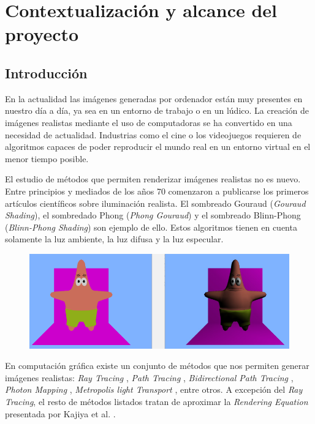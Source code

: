 \documentclass[twoside,a4paper,titlepage,11pt]{report}
\begin{document}
\iftrue

\newpage
\tableofcontents*
\fi

\newpage

\chapter{Contextualización y alcance del proyecto}

\section{Introducción}

En la actualidad las imágenes generadas por ordenador están muy presentes en nuestro día a día, ya sea en un entorno de trabajo o en un lúdico. La creación de imágenes realistas mediante el uso de computadoras se ha convertido en una necesidad de actualidad. Industrias como el cine o los videojuegos requieren de algoritmos capaces de poder reproducir el mundo real en un entorno virtual en el menor tiempo posible.

El estudio de métodos que permiten renderizar imágenes realistas no es nuevo. Entre principios y mediados de los años 70 comenzaron a publicarse los primeros artículos científicos sobre iluminación realista. El sombreado Gouraud (\textit{Gouraud Shading}), el sombredado Phong (\textit{Phong Gouraud}) y el sombreado Blinn-Phong (\textit{Blinn-Phong Shading}) son ejemplo de ello. Estos algoritmos tienen en cuenta solamente la luz ambiente, la luz difusa y la luz especular. 

\begin{figure}[ht]
	\centering
	\includegraphics[scale=0.5]{media/shading_idi.png}
	\caption{}
    \label{fig:idi}
\end{figure}

En computación gráfica existe un conjunto de métodos que nos permiten generar imágenes realistas: \textit{Ray Tracing} \cite{Whitted1980}, \textit{Path Tracing} \cite{Kajiya1986}, \textit{Bidirectional Path Tracing} \cite{Lafortune1993}, \textit{Photon Mapping} \cite{Jensen1996}, \textit{Metropolis light Transport} \cite{Veach1997}, entre otros. A excepción del \textit{Ray Tracing}, el resto de métodos listados tratan de aproximar la \textit{Rendering Equation} presentada por Kajiya et al. \cite{Kajiya1986}.
\end{document}
